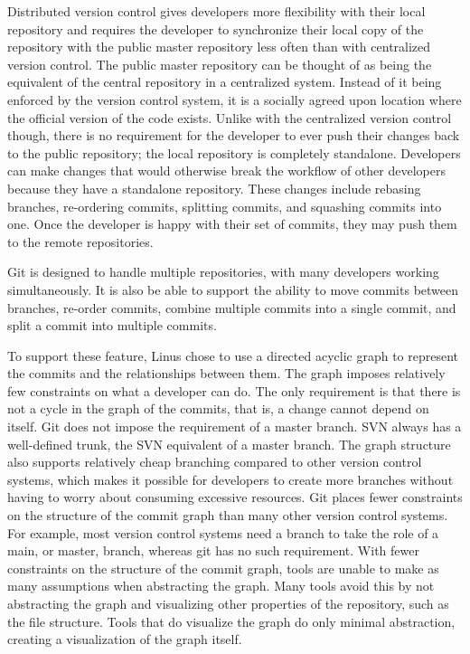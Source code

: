 Distributed version control gives developers more flexibility with their
local repository and requires the developer to synchronize their local
copy of the repository with the public master repository less often
than with centralized version control.
The public master repository can be thought of as being the equivalent
of the central repository in a centralized system.
Instead of it being enforced by the version control system,
it is a socially agreed upon location where the official version of the
code exists.
Unlike with the centralized version control though,
there is no requirement for the developer to ever push their changes
back to the public repository;
the local repository is completely standalone.
Developers can make changes that would otherwise break the workflow of
other developers because they have a standalone repository.
These changes include rebasing branches, re-ordering commits,
splitting commits, and squashing commits into one.
Once the developer is happy with their set of commits, they may push
them to the remote repositories.

Git is designed to handle multiple repositories, with many
developers working simultaneously.
It is also be able to support the ability to move commits between
branches, re-order commits, combine multiple commits into a single
commit, and split a commit into multiple commits.

To support these feature, Linus chose to use a directed acyclic
graph to represent the commits and the relationships between them.
The graph imposes relatively few constraints on what a developer can do.
The only requirement is that there is not a cycle in the graph of the commits,
that is, a change cannot depend on itself.
Git does not impose the requirement of a master branch.
SVN always has a well-defined trunk, the SVN equivalent of a master
branch.
The graph structure also supports relatively cheap branching compared to
other version control systems, which makes it possible for developers to
create more branches without having to worry about consuming excessive
resources.
Git places fewer constraints on the structure of the commit graph than
many other version control systems.
For example, most version control systems need a branch to take the role
of a main, or master, branch, whereas git has no such requirement.
With fewer constraints on the structure of the commit graph,
tools are unable to make as many assumptions when abstracting the graph.
Many tools avoid this by not abstracting the graph and visualizing other
properties of the repository, such as the file structure.
Tools that do visualize the graph do only minimal abstraction, creating
a visualization of the graph itself.

